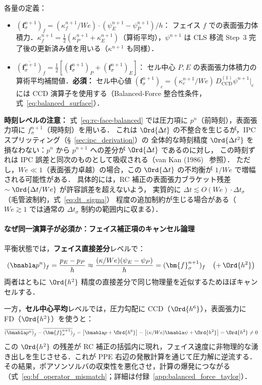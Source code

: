 各量の定義：
\begin{itemize}
  \item $(\bm{f}_\sigma^{n+1})_f = (\kappa_f^{n+1}/We)\cdot(\psi_E^{n+1}-\psi_P^{n+1})/h$：
        フェイス $f$ での表面張力体積力．$\kappa_f^{n+1} = \tfrac{1}{2}(\kappa_P^{n+1}+\kappa_E^{n+1})$（算術平均），$\psi^{n+1}$ は CLS 移流 Step~3 完了後の更新済み値を用いる（$\kappa^{n+1}$ も同様）．
  \item $\overline{(\bm{f}_\sigma^{n+1})}_f = \tfrac{1}{2}[(\bm{f}_\sigma^{n+1})_P + (\bm{f}_\sigma^{n+1})_E]$：
        セル中心 $P, E$ の表面張力体積力の算術平均補間値．\textbf{必須：} セル中心値 $(\bm{f}_\sigma^{n+1})_c = (\kappa_c^{n+1}/We)\,D^{(1)}_{\mathrm{CCD}}\psi^{n+1}\big|_c$ には CCD 演算子を使用する（Balanced-Force 整合性条件，式~\eqref{eq:balanced_surface}）．
\end{itemize}

\noindent\textbf{時刻レベルの注意：}
式~\eqref{eq:rc-face-balanced} では圧力項に $p^n$（前時刻），表面張力項に $f_\sigma^{n+1}$（現時刻）を用いる．
これは $\Ord{\Delta t}$ の不整合を生じるが，IPC スプリッティング（§~\ref{sec:ipc_derivation}）の
全体的な時刻精度 $\Ord{\Delta t^2}$ を損なわない：$p^n$ から $p^{n+1}$ への差分が $\Ord{\Delta t}$ であるのに対し，
この時刻ずれは IPC 誤差と同次のものとして吸収される（van Kan (1986)~\cite{vanKan1986} 参照）．
ただし，$We \ll 1$（表面張力卓越）の場合，この $\Ord{\Delta t}$ の不均衡が $1/We$ で増幅される可能性がある．
具体的には，RC 補正の表面張力ブラケット残差 $\sim \Ord{\Delta t/We}$ が許容誤差を超えないよう，
実質的に $\Delta t \lesssim O(We) \cdot \Delta t_\sigma$（毛管波制約，式~\eqref{eq:dt_sigma}）
程度の追加制約が生じる場合がある（$We \gtrsim 1$ では通常の $\Delta t_\sigma$ 制約の範囲内に収まる）．

\paragraph{なぜ同一演算子が必須か：フェイス補正項のキャンセル論理}

平衡状態では，\textbf{フェイス直接差分}レベルで：
\[
  (\bnabla p^n)_f = \frac{p_E - p_P}{h}
  \approx \frac{(\kappa/We)(\psi_E - \psi_P)}{h}
  = (\bm{f}_\sigma^{n+1})_f \quad \bigl(+\,\Ord{h^2}\bigr)
\]
両者はともに $\Ord{h^2}$ 精度の直接差分で同じ物理量を近似するためほぼキャンセルする．

一方，\textbf{セル中心平均}レベルでは，圧力勾配に CCD（$\Ord{h^6}$），表面張力に FD（$\Ord{h^2}$）を使うと：
\[
  \overline{(\bnabla p^n)}_f - \overline{(\bm{f}_\sigma^{n+1})}_f
  = \bigl[\bnabla p + \Ord{h^6}\bigr] - \bigl[(\kappa/We)\bnabla\psi + \Ord{h^2}\bigr]
  = \Ord{h^2} \neq 0
\]
この $\Ord{h^2}$ の残差が RC 補正の括弧内に現れ，フェイス速度に非物理的な湧き出しを生じさせる．これが PPE 右辺の発散計算を通じて圧力解に逆流する．その結果，ポアソンソルバの収束性を悪化させ，計算の爆発につながる（式~\eqref{eq:bf_operator_mismatch}；詳細は付録~\ref{app:balanced_force_taylor}）．

